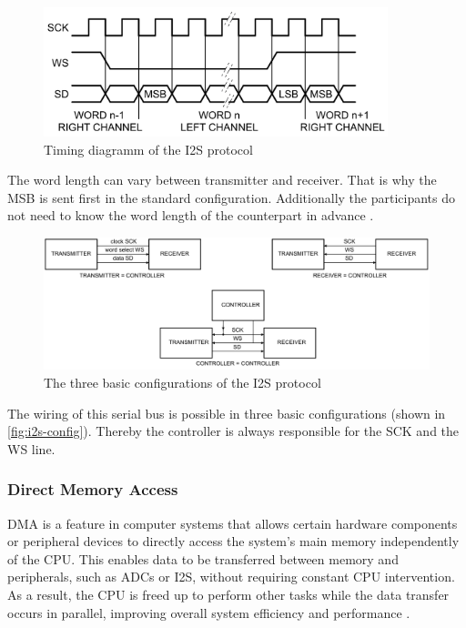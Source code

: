\begin{figure}[!h]
    \centering
    \includegraphics[width=10cm]{img/i2s_timing.png}
    \caption{Timing diagramm of the \ac{I2S} protocol \cite{nxp_i2s}}
    \label{fig:i2s-timing}
\end{figure}

The word length can vary between transmitter and receiver. That is why the \ac{MSB} is sent first in the standard 
configuration. Additionally the participants do not need to know the word length of the counterpart
in advance \cite{nxp_i2s}.

\begin{figure}[!h]
    \centering
    \includegraphics[width=14cm]{img/i2s_config.png}
    \caption{The three basic configurations of the \ac{I2S} protocol \cite{nxp_i2s}}
    \label{fig:i2s-config}
\end{figure}

The wiring of this serial bus is possible in three basic configurations (shown in \autoref{fig:i2s-config}).
Thereby the controller is always responsible for the SCK and the WS line.

\subsubsection{Direct Memory Access}
\label{sec:dma}

\ac{DMA} is a feature in computer systems that allows certain hardware components or peripheral devices to directly
access the system's main memory independently of the \ac{CPU}. This enables data to be transferred
between memory and peripherals, such as \acp{ADC} or \ac{I2S}, without requiring constant \ac{CPU} intervention.
As a result, the \ac{CPU} is freed up to perform other tasks while the data transfer occurs in parallel, improving
overall system efficiency and performance \cite{rm0468}.

